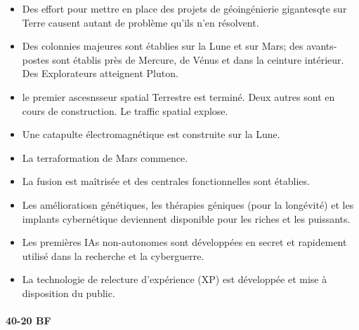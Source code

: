 \documentclass[a4paper,9pt]{article}
\begin{document}
\begin{multicols}{3}
\begin{itemize} 
   \item Des effort pour mettre en place des projets de géoingénierie
      gigantesqte sur Terre causent autant de problème qu'ils n'en résolvent. 
   \item Des colonnies majeures sont établies sur la Lune et sur Mars; des
      avants-postes sont établis près de Mercure, de Vénus et dans la ceinture
      intérieur. Des Explorateurs atteignent Pluton. 
   \item le premier ascesnsseur spatial Terrestre est terminé. Deux autres sont
      en cours de construction. Le traffic spatial explose. 
   \item Une catapulte électromagnétique est construite sur la Lune. 
   \item La terraformation de Mars commence. 
   \item La fusion est maîtrisée et des centrales fonctionnelles sont établies. 
   \item Les amélioratiosn génétiques, les thérapies géniques (pour la
      longévité) et les implants cybernétique deviennent disponible pour les
      riches et les puissants. 
   \item Les premières IAs non-autonomes sont développées en secret et
      rapidement utilisé dans la recherche et la cyberguerre. 
   \item La technologie de relecture d'expérience (XP) est développée et mise à
      disposition du public.
\end{itemize} 

\paragraph{40-20 BF} 


\end{multicols}
\end{document}
